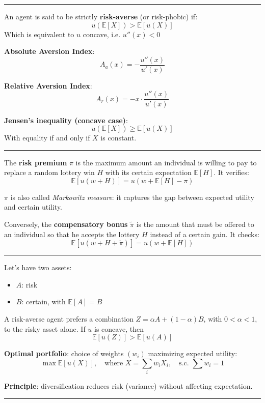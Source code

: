 \hrule

\begin{f}
	An agent is said to be strictly \textbf{risk-averse} (or risk-phobic) if:
	\[
	u(\mathbb{E}[X]) > \mathbb{E}[u(X)]
	\]
	Which is equivalent to \(u\) concave, i.e. \(u''(x) < 0\)
\end{f}

\begin{f}
	\textbf{Absolute Aversion Index}:
	\[
	A_a(x) = -\frac{u''(x)}{u'(x)}
	\]
	
	\textbf{Relative Aversion Index}:
	\[
	A_r(x) = -x \cdot \frac{u''(x)}{u'(x)}
	\]
	
	\textbf{Jensen's inequality (concave case)}:
	\[
	u(\mathbb{E}[X]) \geq \mathbb{E}[u(X)]
	\]
With equality if and only if \(X\) is constant.
\end{f}
\hrule


\begin{f}
	
The \textbf{risk premium} \(\pi\) is the maximum amount an individual is willing to pay to replace a random lottery win \(H\) with its certain expectation \(\mathbb{E}[H]\). It verifies:
\[
\mathbb{E}[u(w + H)] = u(w + \mathbb{E}[H] - \pi)
\]


\(\pi\) is also called \emph{Markowitz measure}: it captures the gap between expected utility and certain utility.

Conversely, the \textbf{compensatory bonus} \(\tilde{\pi}\) is the amount that must be offered to an individual so that he accepts the lottery \(H\) instead of a certain gain. It checks:
\[
\mathbb{E}[u(w + H + \tilde{\pi})] = u(w + \mathbb{E}[H])
\]

\end{f}
\hrule
\begin{f}
	
	Let's have two assets:
	\begin{itemize}
		\item \(A\): risk
		\item \(B\): certain, with \(\mathbb{E}[A] = B\)
	\end{itemize}
	
	A risk-averse agent prefers a combination \(Z = \alpha A + (1 - \alpha) B\), with \(0 < \alpha < 1\), to the risky asset alone.
	If \(u\) is concave, then
	\[
	\mathbb{E}[u(Z)] > \mathbb{E}[u(A)]
	\]
	
	\textbf{Optimal portfolio}: choice of weights \((w_i)\) maximizing expected utility:
	\[
	\max \mathbb{E}[u(X)], \quad \text{where } X = \sum_{i} w_i X_i, \quad \text{s.c. } \sum w_i = 1
	\]
	
	\textbf{Principle}: diversification reduces risk (variance) without affecting expectation.
	
	
\end{f}
\hrule

